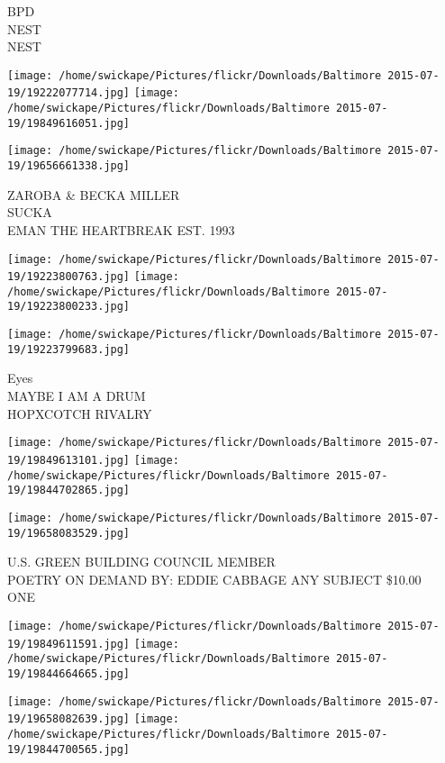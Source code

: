 \documentclass[10pt,letterpaper]{article}
\begin{document}
BPD\\
NEST\\
NEST
\pagebreak

\texttt{[image: /home/swickape/Pictures/flickr/Downloads/Baltimore 2015-07-19/19222077714.jpg]}
\texttt{[image: /home/swickape/Pictures/flickr/Downloads/Baltimore 2015-07-19/19849616051.jpg]}

\vspace{0.25in}
\texttt{[image: /home/swickape/Pictures/flickr/Downloads/Baltimore 2015-07-19/19656661338.jpg]}

ZAROBA \& BECKA MILLER\\
SUCKA\\
EMAN THE HEARTBREAK EST. 1993
\pagebreak

\texttt{[image: /home/swickape/Pictures/flickr/Downloads/Baltimore 2015-07-19/19223800763.jpg]}
\texttt{[image: /home/swickape/Pictures/flickr/Downloads/Baltimore 2015-07-19/19223800233.jpg]}

\vspace{0.25in}
\texttt{[image: /home/swickape/Pictures/flickr/Downloads/Baltimore 2015-07-19/19223799683.jpg]}

Eyes\\
MAYBE I AM A DRUM\\
HOPXCOTCH RIVALRY
\pagebreak

\texttt{[image: /home/swickape/Pictures/flickr/Downloads/Baltimore 2015-07-19/19849613101.jpg]}
\texttt{[image: /home/swickape/Pictures/flickr/Downloads/Baltimore 2015-07-19/19844702865.jpg]}

\vspace{0.25in}
\texttt{[image: /home/swickape/Pictures/flickr/Downloads/Baltimore 2015-07-19/19658083529.jpg]}

U.S. GREEN BUILDING COUNCIL MEMBER\\
POETRY ON DEMAND BY: EDDIE CABBAGE ANY SUBJECT \$10.00\\
ONE
\pagebreak

\texttt{[image: /home/swickape/Pictures/flickr/Downloads/Baltimore 2015-07-19/19849611591.jpg]}
\texttt{[image: /home/swickape/Pictures/flickr/Downloads/Baltimore 2015-07-19/19844664665.jpg]}

\texttt{[image: /home/swickape/Pictures/flickr/Downloads/Baltimore 2015-07-19/19658082639.jpg]}
\texttt{[image: /home/swickape/Pictures/flickr/Downloads/Baltimore 2015-07-19/19844700565.jpg]}
\end{document}
